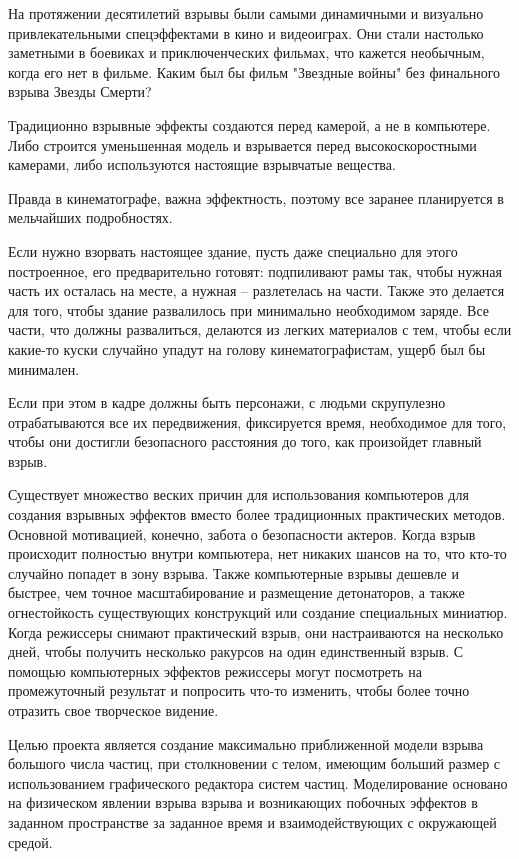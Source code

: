 \Introduction

\hfill

	На протяжении десятилетий взрывы были самыми динамичными и визуально привлекательными спецэффектами в кино и видеоиграх. Они стали настолько заметными в боевиках и приключенческих фильмах, что кажется необычным, когда его нет в фильме. Каким был бы фильм "Звездные войны"  без финального взрыва Звезды Смерти? 
	
	Традиционно взрывные эффекты создаются перед камерой, а не в компьютере. Либо строится уменьшенная модель и взрывается перед высокоскоростными камерами, либо используются настоящие взрывчатые вещества. 
	
	Правда в кинематографе, важна эффектность, поэтому все заранее планируется в мельчайших подробностях.
	
	Если нужно взорвать настоящее здание, пусть даже специально для этого построенное, его предварительно готовят: подпиливают рамы так, чтобы нужная часть их осталась на месте, а нужная – разлетелась на части. Также это делается для того, чтобы здание развалилось при минимально необходимом заряде. Все части, что должны развалиться, делаются из легких материалов с тем, чтобы если какие-то куски случайно упадут на голову кинематографистам, ущерб был бы минимален. 
	
	Если при этом в кадре должны быть персонажи, с людьми скрупулезно отрабатываются все их передвижения, фиксируется время, необходимое для того, чтобы они достигли безопасного расстояния до того, как произойдет главный взрыв. \cite{cinemaexplosion}
	
	Существует множество веских причин для использования компьютеров для создания взрывных эффектов вместо более традиционных практических методов. Основной мотивацией, конечно, забота о безопасности актеров. Когда взрыв происходит полностью внутри компьютера, нет никаких шансов на то, что кто-то случайно попадет в зону взрыва. Также компьютерные взрывы дешевле и быстрее, чем точное масштабирование и размещение детонаторов, а также огнестойкость существующих конструкций или создание специальных миниатюр. Когда режиссеры снимают практический взрыв, они настраиваются на несколько дней, чтобы получить несколько ракурсов на один единственный взрыв. С помощью компьютерных эффектов режиссеры могут посмотреть на промежуточный результат и попросить что-то изменить, чтобы более точно отразить свое творческое видение. 
	
	Целью проекта является создание максимально приближенной модели взрыва большого числа частиц, при столкновении с телом, имеющим больший размер с использованием графического редактора систем частиц. Моделирование основано на физическом явлении взрыва взрыва и возникающих побочных эффектов в заданном пространстве за заданное время и взаимодействующих с окружающей средой. 
	
